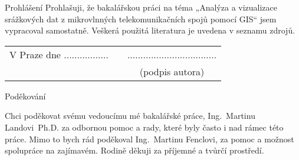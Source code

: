 \newcommand{\odsaditodzhora}{\hskip1pt\vfill}

\odsaditodzhora
\noindent Prohlášení
Prohlašuji, že bakalářskou práci na téma „Analýza a vizualizace srážkových dat z mikrovlnných telekomunikačních spojů pomocí GIS“ jsem vypracoval samostatně. Veškerá použitá literatura je uvedena v seznamu zdrojů.

\begin{flushleft}
\begin{tabular}{cp{}c}
V Praze dne .................
& 
&
..................................
\\
&&
(podpis autora)
\end{tabular}

\end{flushleft}
\newpage

\odsaditodzhora
\noindent Poděkování

Chci poděkovat svému vedoucímu mé bakalářské práce, Ing.~Martinu Landovi~Ph.D. za odbornou pomoc a rady, které byly často i nad rámec této práce. Mimo to bych rád poděkoval Ing.~Martinu Fenclovi, za pomoc a možnost spolupráce na zajímavém. Rodině děkuji za příjemné a tvůrčí prostředí. 

\newpage
